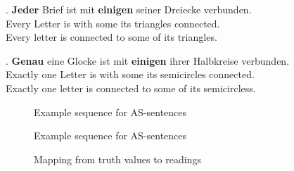 \documentclass[a4paper,10pt]{article}
\begin{document}
\exg. \label{ex:as}{\bf Jeder} Brief ist mit {\bf einigen} seiner Dreiecke verbunden.\\
Every Letter is with some its triangles connected.\\
Every letter is connected to some of its triangles.

\exg. \label{ex:es}{\bf Genau} eine Glocke ist mit {\bf einigen} ihrer Halbkreise verbunden.\\
Exactly one Letter is with some its semicircles connected.\\
Exactly one letter is connected to some of its semicircless.

\begin{figure}[ht]
	\centering
	\caption[]{Example sequence for AS-sentences}
	\label{fig:exseqAS}
\end{figure}

\begin{figure}[ht]
	\centering
	\caption[]{Example sequence for AS-sentences}
	\label{fig:exseqES}
\end{figure}






\begin{figure}[ht]
	\centering
	\caption{Mapping from truth values to readings}
	\label{fig:subfigureExample}
	\end{figure}
\end{document}
